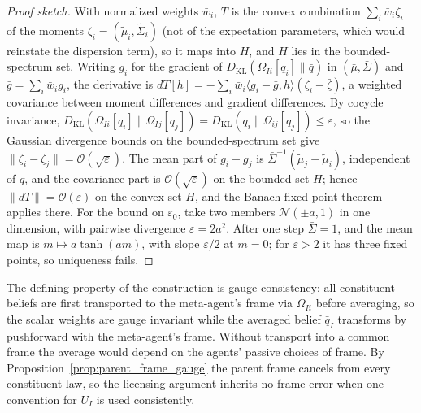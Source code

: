 \begin{proof}[Proof sketch]
With normalized weights $\bar{w}_i$, $T$ is the convex combination $\sum_i \bar{w}_i \zeta_i$ of the moments $\zeta_i = (\tilde{\mu}_i, \tilde{\Sigma}_i)$ (not of the expectation parameters, which would reinstate the dispersion term), so it maps into $H$, and $H$ lies in the bounded-spectrum set. Writing $g_i$ for the gradient of $D_{\mathrm{KL}}(\Omega_{Ii}[q_i] \| \bar{q})$ in $(\bar{\mu}, \bar{\Sigma})$ and $\bar{g} = \sum_i \bar{w}_i g_i$, the derivative is $dT[h] = -\sum_i \bar{w}_i \langle g_i - \bar{g}, h\rangle (\zeta_i - \bar{\zeta})$, a weighted covariance between moment differences and gradient differences. By cocycle invariance, $D_{\mathrm{KL}}(\Omega_{Ii}[q_i] \| \Omega_{Ij}[q_j]) = D_{\mathrm{KL}}(q_i \| \Omega_{ij}[q_j]) \le \varepsilon$, so the Gaussian divergence bounds on the bounded-spectrum set give $\|\zeta_i - \zeta_j\| = \mathcal{O}(\sqrt{\varepsilon})$. The mean part of $g_i - g_j$ is $\bar{\Sigma}^{-1}(\tilde{\mu}_j - \tilde{\mu}_i)$, independent of $\bar{q}$, and the covariance part is $\mathcal{O}(\sqrt{\varepsilon})$ on the bounded set $H$; hence $\|dT\| = \mathcal{O}(\varepsilon)$ on the convex set $H$, and the Banach fixed-point theorem applies there. For the bound on $\varepsilon_0$, take two members $\mathcal{N}(\pm a, 1)$ in one dimension, with pairwise divergence $\varepsilon = 2a^2$. After one step $\bar{\Sigma} = 1$, and the mean map is $m \mapsto a\tanh(am)$, with slope $\varepsilon/2$ at $m = 0$; for $\varepsilon > 2$ it has three fixed points, so uniqueness fails.
\end{proof}

The defining property of the construction is gauge consistency: all constituent beliefs are first transported to the meta-agent's frame via $\Omega_{Ii}$ before averaging, so the scalar weights are gauge invariant while the averaged belief $\bar{q}_I$ transforms by pushforward with the meta-agent's frame. Without transport into a common frame the average would depend on the agents' passive choices of frame. By Proposition~\ref{prop:parent_frame_gauge} the parent frame cancels from every constituent law, so the licensing argument inherits no frame error when one convention for $U_I$ is used consistently.

